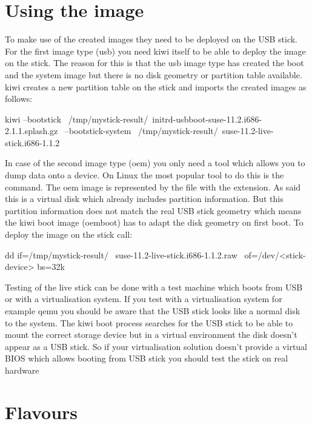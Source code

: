 \section{Using the image}

To make use of the created images they need to be deployed on the
USB stick. For the first image type (usb) you need kiwi itself to
be able to deploy the image on the stick. The reason for this is
that the usb image type has created the boot and the system image
but there is no disk geometry or partition table available. kiwi
creates a new partition table on the stick and imports the created
images as follows:

\begin{Command}{13cm}
kiwi --bootstick \
   /tmp/mystick-result/\
   initrd-usbboot-suse-11.2.i686-2.1.1.splash.gz \
   --bootstick-system \
   /tmp/mystick-result/\
   suse-11.2-live-stick.i686-1.1.2
\end{Command}

In case of the second image type (oem) you only need a tool which allows
you to dump data onto a device. On Linux the most popular tool to do this
is the \cmd{dd} command. The oem image is represented by the file
with the  extension. As said this is a virtual disk which already
includes partition information. But this partition information does
not match the real USB stick geometry which means the kiwi boot image
(oemboot) has to adapt the disk geometry on first boot. To deploy the
image on the stick call:

\begin{Command}{13cm}
dd if=/tmp/mystick-result/ \
   suse-11.2-live-stick.i686-1.1.2.raw \
   of=/dev/<stick-device> bs=32k
\end{Command}

Testing of the live stick can be done with a test machine which boots from
USB or with a virtualisation system. If you test with a virtualisation
system for example qemu you should be aware that the USB stick looks like
a normal disk to the system. The kiwi boot process searches for the USB
stick to be able to mount the correct storage device but in a virtual
environment the disk doesn't appear as a USB stick. So if your
virtualisation solution doesn't provide a virtual BIOS which allows booting
from USB stick you should test the stick on real hardware

\section{Flavours}

